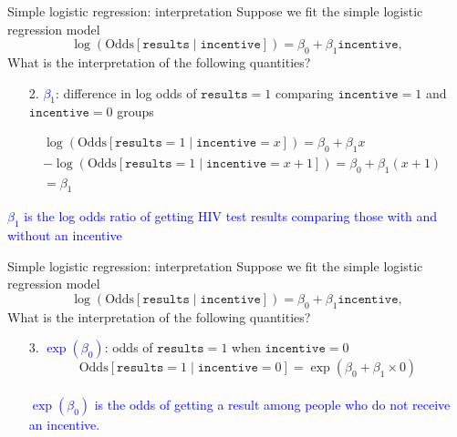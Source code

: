 \documentclass[10pt,t]{beamer}
\begin{document}
\begin{frame}{Simple logistic regression: interpretation}
	Suppose we fit the simple logistic regression model $$\log\left(\text{Odds}[\texttt{results} \mid \texttt{incentive}]\right) = \beta_0 + \beta_1 \texttt{incentive},$$ What is the interpretation of the following quantities?
	
	\medskip
	
	\begin{enumerate}
		\item[2.] \textcolor{blue}{$\beta_1$}: difference in log odds of $\texttt{results} = 1$ comparing $\texttt{incentive} = 1$ and $\texttt{incentive} =0$ groups
	\end{enumerate} 

	\begin{align*}
	&\log\left(\text{Odds}[\texttt{results} =1 \mid \texttt{incentive} = x]\right) = \beta_0 + \beta_1x\\
	&-\log\left(\text{Odds}[\texttt{results} =1 \mid \texttt{incentive} = x + 1]\right) = \beta_0 + \beta_1(x + 1)\\
	&= \beta_1
\end{align*}

\medskip

\textcolor{blue}{$\beta_1$ is the log odds ratio of getting HIV test results comparing those with and without an incentive}

\end{frame}

\begin{frame}{Simple logistic regression: interpretation}
	Suppose we fit the simple logistic regression model $$\log\left(\text{Odds}[\texttt{results} \mid \texttt{incentive}]\right) = \beta_0 + \beta_1 \texttt{incentive},$$ What is the interpretation of the following quantities?
	\medskip
	\begin{enumerate}
		\item[3.] \textcolor{blue}{$\exp(\beta_0)$}: odds of $\texttt{results} = 1$ when $\texttt{incentive} = 0$
		$$\text{Odds}[\texttt{results}  =1 \mid \texttt{incentive} = 0] = \exp(\beta_0 + \beta_1\times 0)$$\\
		
		\textcolor{blue}{$\exp(\beta_0)$ is the odds of getting a result among people who do not receive an incentive.}
	\end{enumerate} 
\end{frame}
\end{document}
